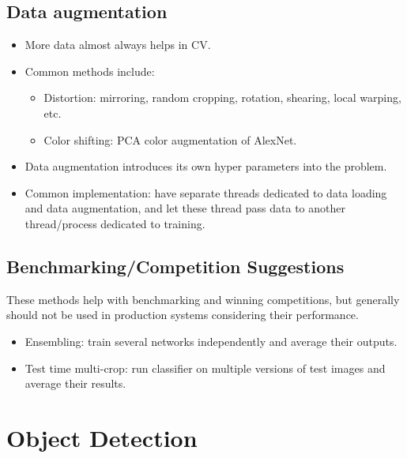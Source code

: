 \subsection{Data augmentation}
\begin{itemize}
  \item More data almost always helps in CV. 
  \item Common methods include:
  \begin{itemize}
    \item Distortion: mirroring, random cropping, rotation, shearing, local warping, etc.
    \item Color shifting: PCA color augmentation of AlexNet.
  \end{itemize}
  \item Data augmentation introduces its own hyper parameters into the problem.
  \item Common implementation: have separate threads dedicated to data loading and data augmentation, and let these thread pass data to another thread/process dedicated to training.
\end{itemize}
\subsection{Benchmarking/Competition Suggestions}
These methods help with benchmarking and winning competitions, but generally should not be used in production systems considering their performance.
\begin{itemize}
  \item Ensembling: train several networks independently and average their outputs.
  \item Test time multi-crop: run classifier on multiple versions of test images and average their results.
\end{itemize}
\section{Object Detection}

